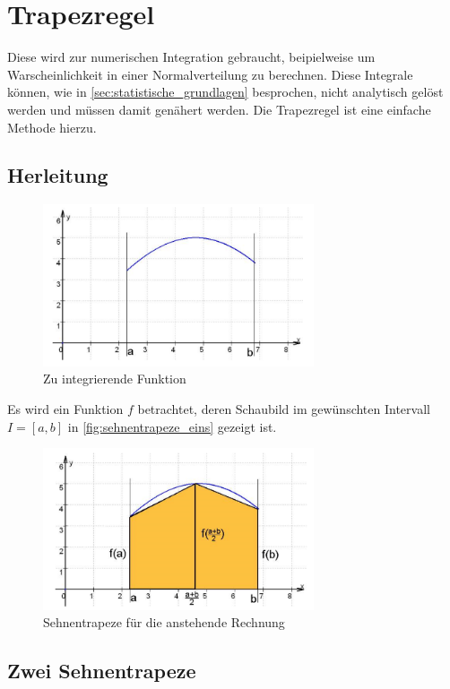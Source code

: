 \section{Trapezregel}
\label{sec:trapezregel}
Diese wird zur numerischen Integration gebraucht, beipielweise um Warscheinlichkeit in einer Normalverteilung zu berechnen. Diese Integrale können, wie in \autoref{sec:statistische_grundlagen} besprochen, nicht analytisch gelöst werden und müssen damit genähert werden. Die Trapezregel ist eine einfache Methode hierzu.
\subsection{Herleitung}
\label{sec:herleitung}

\begin{figure}[h]
    \centering
    \includegraphics[width=8cm]{Bilder/keplersche_fassregel_funktion.png}
    \caption{Zu integrierende Funktion \cite{skript}}    
    \label{fig:keplersche_fassregel}
\end{figure}
Es wird ein Funktion $f$ betrachtet, deren Schaubild im gewünschten Intervall $I = [a, b]$ in \autoref{fig:sehnentrapeze_eins} gezeigt ist.

\begin{figure}[h]
  \centering
        \includegraphics[width=8cm]{Bilder/sehnentrapeze.png}
      \caption{Sehnentrapeze für die anstehende Rechnung}
      \label{fig:sehnentrapeze_eins}
    \end{figure}
\subsection*{Zwei Sehnentrapeze}


